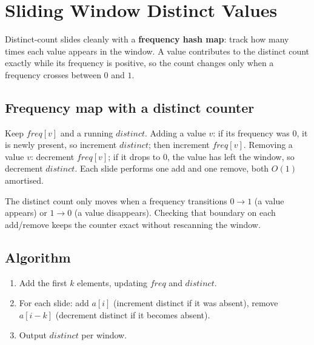 \section{Sliding Window Distinct Values}
\label{sec:cses-sw-distinct}


\begin{patternbox}
Distinct-count slides cleanly with a \textbf{frequency hash map}: track how
many times each value appears in the window. A value contributes to the
distinct count exactly while its frequency is positive, so the count
changes only when a frequency crosses between $0$ and $1$.
\end{patternbox}

\subsection*{Frequency map with a distinct counter}

Keep $\textit{freq}[v]$ and a running $\textit{distinct}$. Adding a value
$v$: if its frequency was $0$, it is newly present, so increment
$\textit{distinct}$; then increment $\textit{freq}[v]$. Removing a value
$v$: decrement $\textit{freq}[v]$; if it drops to $0$, the value has left
the window, so decrement $\textit{distinct}$. Each slide performs one add
and one remove, both $O(1)$ amortised.

\begin{ideabox}
The distinct count only moves when a frequency transitions $0\to1$ (a value
appears) or $1\to0$ (a value disappears). Checking that boundary on each
add/remove keeps the counter exact without rescanning the window.
\end{ideabox}

\subsection*{Algorithm}

\begin{enumerate}
  \item Add the first $k$ elements, updating $\textit{freq}$ and
        $\textit{distinct}$.
  \item For each slide: add $a[i]$ (increment distinct if it was absent),
        remove $a[i-k]$ (decrement distinct if it becomes absent).
  \item Output $\textit{distinct}$ per window.
\end{enumerate}

